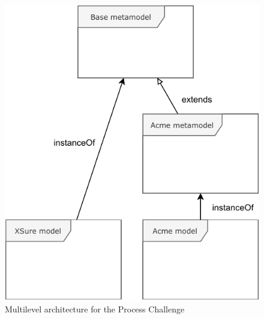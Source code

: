 \begin{figure}
    \centering
    \includegraphics[width=0.7 \columnwidth]{Figures/MultilevelArchitecture.pdf}
    \caption{Multilevel architecture for the Process Challenge}
    \label{fig:MultilevelArchitecture}
\end{figure}


